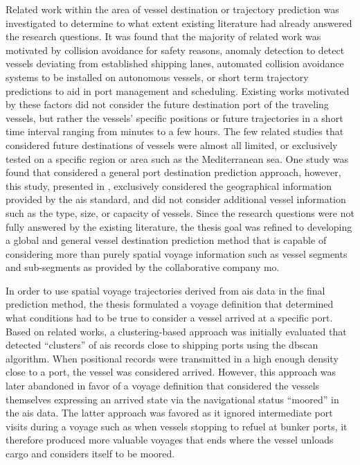 Related work within the area of vessel destination or trajectory prediction was investigated to determine to what extent existing literature had already answered the research questions. It was found that the majority of related work was motivated by collision avoidance for safety reasons, anomaly detection to detect vessels deviating from established shipping lanes, automated collision avoidance systems to be installed on autonomous vessels, or short term trajectory predictions to aid in port management and scheduling. Existing works motivated by these factors did not consider the future destination port of the traveling vessels, but rather the vessels' specific positions or future trajectories in a short time interval ranging from minutes to a few hours. The few related studies that considered future destinations of vessels were almost all limited, or exclusively tested on a specific region or area such as the Mediterranean sea. One study was found that considered a general port destination prediction approach, however, this study, presented in \cite{Zhang2020AISApproach}, exclusively considered the geographical information provided by the \acrshort{ais} standard, and did not consider additional vessel information such as the type, size, or capacity of vessels. Since the research questions were not fully answered by the existing literature, the thesis goal was refined to developing a global and general vessel destination prediction method that is capable of considering more than purely spatial voyage information such as vessel segments and sub-segments as provided by the collaborative company \acrfull{mo}.

In order to use spatial voyage trajectories derived from \acrshort{ais} data in the final prediction method, the thesis formulated a voyage definition that determined what conditions had to be true to consider a vessel arrived at a specific port. Based on related works, a clustering-based approach was initially evaluated that detected ``clusters'' of \acrshort{ais} records close to shipping ports using the \acrfull{dbscan} algorithm. When positional records were transmitted in a high enough density close to a port, the vessel was considered arrived. However, this approach was later abandoned in favor of a voyage definition that considered the vessels themselves expressing an arrived state via the navigational status ``moored'' in the \acrshort{ais} data. The latter approach was favored as it ignored intermediate port visits during a voyage such as when vessels stopping to refuel at bunker ports, it therefore produced more valuable voyages that ends where the vessel unloads cargo and considers itself to be moored.

